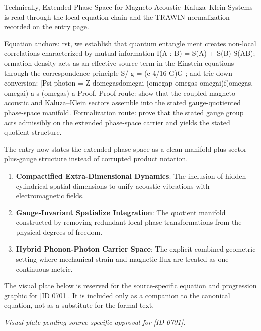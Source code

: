 Technically, Extended Phase Space for Magneto-Acoustic--Kaluza--Klein Systems is read through the local equation chain and the TRAWIN normalization recorded on the entry page.

Equation anchors: rst, we establish that quantum entangle ment creates non-local correlations characterized by mutual information I(A : B) = S(A) + S(B)   S(AB); ormation density acts as an effective source term in the Einstein equations through the correspondence principle  S/ g   = (c 4/16 G)G  ; and tric down-conversion: |Psi photon = Z domegasdomegai (omegap   omegas   omegai)f(omegas, omegai) a   s (omegas) a   Proof. Proof route: show that the coupled magneto-acoustic and Kaluza--Klein sectors assemble into the stated gauge-quotiented phase-space manifold. Formalization route: prove that the stated gauge group acts admissibly on the extended phase-space carrier and yields the stated quotient structure.

The entry now states the extended phase space as a clean manifold-plus-sector-plus-gauge structure instead of corrupted product notation.
\endgroup

\begin{enumerate}[leftmargin=1.6em,itemsep=6pt,topsep=4pt]
\item \textbf{Compactified Extra-Dimensional Dynamics}: The inclusion of hidden cylindrical spatial dimensions to unify acoustic vibrations with electromagnetic fields.
\item \textbf{Gauge-Invariant Spatialize Integration}: The quotient manifold constructed by removing redundant local phase transformations from the physical degrees of freedom.
\item \textbf{Hybrid Phonon-Photon Carrier Space}: The explicit combined geometric setting where mechanical strain and magnetic flux are treated as one continuous metric.
\end{enumerate}

\begingroup\footnotesize\sloppy
The visual plate below is reserved for the source-specific equation and progression graphic for [ID 0701]. It is included only as a companion to the canonical equation, not as a substitute for the formal text.
\par\endgroup
\begingroup\footnotesize\itshape
Visual plate pending source-specific approval for [ID 0701].
\par\endgroup

